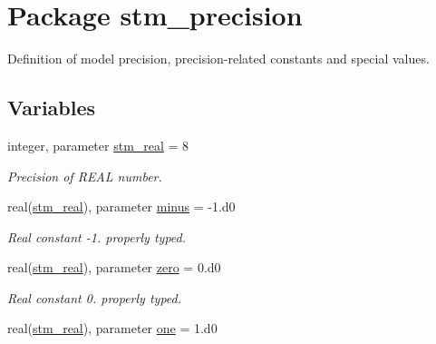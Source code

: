 \hypertarget{a00071}{
\section{Package stm\_\-precision}
\label{a00071}
}
Definition of model precision, precision-related constants and special values.  


\subsection*{Variables}
\begin{CompactItemize}
\item 
\hypertarget{a00071_be430a25ddbcfe29c5bd13189b85de5d}{
integer, parameter \hyperlink{a00071_be430a25ddbcfe29c5bd13189b85de5d}{stm\_\-real} = 8}
\label{a00071_be430a25ddbcfe29c5bd13189b85de5d}

\begin{CompactList}\small\item\em Precision of REAL number. \item\end{CompactList}\item 
\hypertarget{a00071_af8ce5fc5c9c72c4dcc02d9ac3c0d706}{
real(\hyperlink{a00071_be430a25ddbcfe29c5bd13189b85de5d}{stm\_\-real}), parameter \hyperlink{a00071_af8ce5fc5c9c72c4dcc02d9ac3c0d706}{minus} = -1.d0}
\label{a00071_af8ce5fc5c9c72c4dcc02d9ac3c0d706}

\begin{CompactList}\small\item\em Real constant -1. properly typed. \item\end{CompactList}\item 
\hypertarget{a00071_c6139179d1dc2d9e515121f15ad0c4a0}{
real(\hyperlink{a00071_be430a25ddbcfe29c5bd13189b85de5d}{stm\_\-real}), parameter \hyperlink{a00071_c6139179d1dc2d9e515121f15ad0c4a0}{zero} = 0.d0}
\label{a00071_c6139179d1dc2d9e515121f15ad0c4a0}

\begin{CompactList}\small\item\em Real constant 0. properly typed. \item\end{CompactList}\item 
\hypertarget{a00071_146bdef5e9c346a5d4afbdc679f358c8}{
real(\hyperlink{a00071_be430a25ddbcfe29c5bd13189b85de5d}{stm\_\-real}), parameter \hyperlink{a00071_146bdef5e9c346a5d4afbdc679f358c8}{one} = 1.d0}
\label{a00071_146bdef5e9c346a5d4afbdc679f358c8}


\end{CompactItemize}

